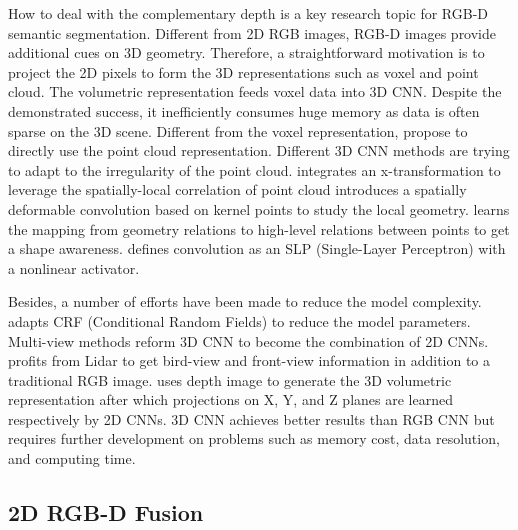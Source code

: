 \documentclass[lettersize,journal]{IEEEtran}
\begin{document}
How to deal with the complementary depth is a key research topic for RGB-D semantic segmentation. Different from 2D RGB images, RGB-D images provide additional cues on 3D geometry. Therefore, a straightforward motivation is to project the 2D pixels to form the 3D representations such as voxel and point cloud. The volumetric representation \cite{3DConvLanding,wu20153d} feeds voxel data into 3D CNN. Despite the demonstrated success, it inefficiently consumes huge memory as data is often sparse on the 3D scene. Different from the voxel representation, \cite{Qi2017pointnet,NIPS2017Pointnet} propose to directly use the point cloud representation. Different 3D CNN methods are trying to adapt to the irregularity of the point cloud. \cite{li2018pointcnn} integrates an x-transformation to leverage the spatially-local correlation of point cloud \cite{Thomas2019kpconv} introduces a spatially deformable convolution based on kernel points to study the local geometry. \cite{liu2019relation} learns the mapping from geometry relations to high-level relations between points to get a shape awareness. \cite{liu2019densepoint} defines convolution as an SLP (Single-Layer Perceptron) with a nonlinear activator.

Besides, a number of efforts have been made to reduce the model complexity. \cite{tchapmi2017segcloud} adapts CRF (Conditional Random Fields) to reduce the model parameters. Multi-view methods \cite{Chen_2017MultiView,Ge20173Dpose,3DFCN,Qi2016VolMultiView} reform 3D CNN to become the combination of 2D CNNs. \cite{Chen_2017MultiView} profits from Lidar to get bird-view and front-view information in addition to a traditional RGB image. \cite{Ge20173Dpose} uses depth image to generate the 3D volumetric representation after which projections on X, Y, and Z planes are learned respectively by 2D CNNs. 3D CNN achieves better results than RGB CNN but requires further development on problems such as memory cost, data resolution, and computing time.


\subsection{2D RGB-D Fusion}
\end{document}
